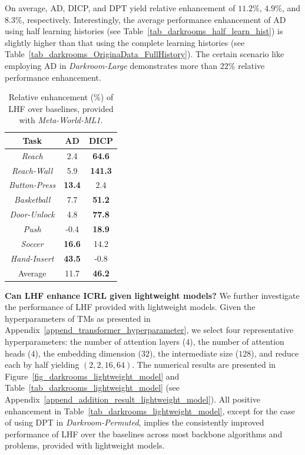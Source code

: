 \documentclass{article}
\begin{document}
On average, AD, DICP, and DPT yield relative enhancement of $11.2\%$, $4.9\%$, and $8.3\%$, respectively. Interestingly, the average performance enhancement of AD using half learning histories (see Table~\ref{tab_darkrooms_half_learn_hist}) is slightly higher than that using the complete learning histories (see Table~\ref{tab_darkrooms_OriginaData_FullHistory}). The certain scenario like employing AD in \textit{Darkroom-Large} demonstrates more than $22\%$ relative performance enhancement.
\begin{table}
    \centering
    \caption{Relative enhancement (\%) of LHF over baselines, provided with \textit{Meta-World-ML1}.}
    \label{tab_metaworld_ppo}
    \begin{tabular}{ccc}
    \toprule
    Task & AD & DICP \\
    \midrule
     \textit{Reach} & 2.4 & \textbf{64.6} \\
     \textit{Reach-Wall} & 5.9 & \textbf{141.3} \\
     \textit{Button-Press} & \textbf{13.4} & 2.4 \\
     \textit{Basketball} & 7.7 & \textbf{51.2} \\
     \textit{Door-Unlock} & 4.8 & \textbf{77.8} \\
     \textit{Push} & -0.4 & \textbf{18.9} \\
     \textit{Soccer} & \textbf{16.6} & 14.2 \\
     \textit{Hand-Insert} & \textbf{43.5} & -0.8 \\
     \midrule
     Average & 11.7 & \textbf{46.2} \\
    \bottomrule
    \end{tabular}
    \vspace{-5pt}
\end{table}
\textbf{Can LHF enhance ICRL given lightweight models?}
We further investigate the performance of LHF provided with lightweight models.
Given the hyperparameters of TMs as presented in Appendix~\ref{append_transformer_hyperparameter}, we select four representative hyperparameters: the number of attention layers ($4$), the number of attention heads ($4$), the embedding dimension ($32$), the intermediate size ($128$), and reduce each by half yielding $(2, 2, 16, 64)$.
The numerical results are presented in Figure~\ref{fig_darkrooms_lightweight_model} and Table~\ref{tab_darkrooms_lightweight_model} (see Appendix~\ref{append_addition_result_lightweight_model}).
All positive enhancement in Table~\ref{tab_darkrooms_lightweight_model}, except for the case of using DPT in \textit{Darkroom-Permuted}, implies the consistently improved performance of LHF over the baselines across most backbone algorithms and problems, provided with lightweight models.
\end{document}
